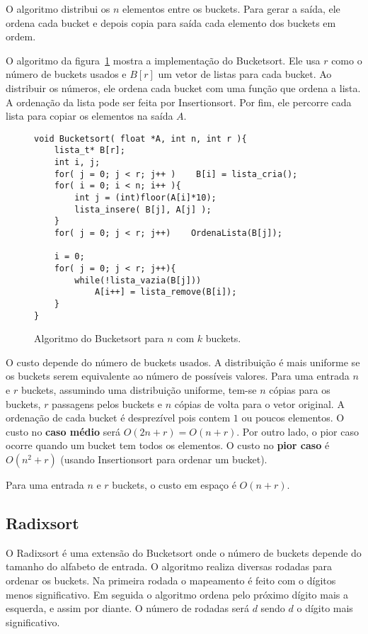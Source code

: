 O algoritmo distribui os $n$ elementos entre os buckets.
Para gerar a saída, ele ordena cada bucket e depois copia para saída 
cada elemento dos buckets em ordem.

O algoritmo da figura~\ref{aula03:algo:bucket} mostra a implementação do
Bucketsort.
Ele usa $r$ como o número de buckets usados e $B[r]$ um vetor de listas para
cada bucket.
Ao distribuir os números, ele ordena cada bucket com uma função
que ordena a lista. A ordenação da lista pode ser feita por
Insertionsort.
Por fim, ele percorre cada lista para copiar os elementos na saída $A$.
%
\begin{figure}[!htb]
\centering
\begin{framed}
\begin{lstlisting}
void Bucketsort( float *A, int n, int r ){
	lista_t* B[r];
	int i, j;
	for( j = 0; j < r; j++ )    B[i] = lista_cria();
	for( i = 0; i < n; i++ ){
		int j = (int)floor(A[i]*10);
		lista_insere( B[j], A[j] );
	}
	for( j = 0; j < r; j++)    OrdenaLista(B[j]);

	i = 0;
	for( j = 0; j < r; j++){
		while(!lista_vazia(B[j]))
			A[i++] = lista_remove(B[i]);
	}
}
\end{lstlisting}
\end{framed}
\caption{Algoritmo do Bucketsort para $n$ com $k$ buckets.}
\label{aula03:algo:bucket}
\end{figure}

O custo depende do número de buckets usados. 
A distribuição é mais uniforme se os buckets serem equivalente ao número de possíveis valores.
Para uma entrada $n$ e $r$ buckets, assumindo uma distribuição uniforme, tem-se
$n$ cópias para os buckets, $r$ passagens pelos buckets e $n$ cópias de volta
para o vetor original.
A ordenação de cada bucket é desprezível pois contem $1$ ou poucos elementos.
O custo no {\bf caso médio} será $O(2n+r) = O(n+r)$. 
Por outro lado, o pior caso ocorre quando um bucket tem todos os elementos.
O custo no {\bf pior caso}  é $O(n^2+r)$ (usando Insertionsort para ordenar um bucket).

Para uma entrada $n$ e $r$ buckets, o custo em espaço é $O(n+r)$.

\subsection{Radixsort}

O Radixsort é uma extensão do Bucketsort onde o número de buckets depende do
tamanho  do alfabeto de entrada.
O algoritmo realiza diversas rodadas para ordenar os buckets. 
Na primeira rodada o mapeamento é feito com o dígitos menos significativo.
Em seguida o algoritmo ordena pelo próximo dígito mais a esquerda, e assim por diante.
O número de rodadas será $d$ sendo $d$ o dígito mais significativo.

